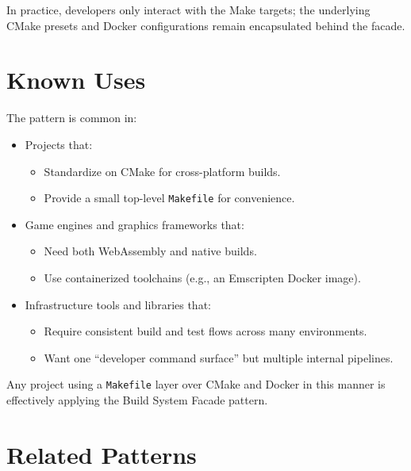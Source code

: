 \documentclass[11pt]{article}
\begin{document}
In practice, developers only interact with the Make targets; the underlying CMake presets and Docker configurations remain encapsulated behind the facade.

\section{Known Uses}

The pattern is common in:
\begin{itemize}[noitemsep]
  \item Projects that:
    \begin{itemize}[noitemsep]
      \item Standardize on CMake for cross-platform builds.
      \item Provide a small top-level \texttt{Makefile} for convenience.
    \end{itemize}
  \item Game engines and graphics frameworks that:
    \begin{itemize}[noitemsep]
      \item Need both WebAssembly and native builds.
      \item Use containerized toolchains (e.g., an Emscripten Docker image).
    \end{itemize}
  \item Infrastructure tools and libraries that:
    \begin{itemize}[noitemsep]
      \item Require consistent build and test flows across many environments.
      \item Want one ``developer command surface'' but multiple internal pipelines.
    \end{itemize}
\end{itemize}

Any project using a \texttt{Makefile} layer over CMake and Docker in this manner is effectively applying the Build System Facade pattern.

\section{Related Patterns}
\end{document}
